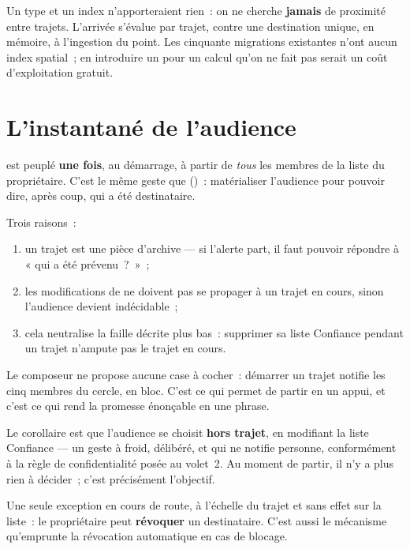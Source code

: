 Un type  et un index  n'apporteraient rien~: on ne cherche
\textbf{jamais} de proximité entre trajets. L'arrivée s'évalue par trajet, contre une
destination unique, en mémoire, à l'ingestion du point. Les cinquante migrations existantes
n'ont aucun index spatial~; en introduire un pour un calcul qu'on ne fait pas serait un coût
d'exploitation gratuit.

\section{L'instantané de l'audience}

 est peuplé \textbf{une fois}, au démarrage, à partir de \emph{tous} les
membres de la liste  du propriétaire. C'est le même geste que
 ()~: matérialiser l'audience
pour pouvoir dire, après coup, qui a été destinataire.

Trois raisons~:

\begin{enumerate}[leftmargin=1.6em]
  \item un trajet est une pièce d'archive --- si l'alerte part, il faut pouvoir répondre à
        « qui a été prévenu~?~»~;
  \item les modifications de  ne doivent pas se propager à un
        trajet en cours, sinon l'audience devient indécidable~;
  \item cela neutralise la faille décrite plus bas~: supprimer sa liste Confiance pendant un
        trajet n'ampute pas le trajet en cours.
\end{enumerate}

\begin{note}
Le composeur ne propose aucune case à cocher~: démarrer un trajet notifie les cinq membres
du cercle, en bloc. C'est ce qui permet de partir en un appui, et c'est ce qui rend la
promesse énonçable en une phrase.

Le corollaire est que l'audience se choisit \textbf{hors trajet}, en modifiant la liste
Confiance --- un geste à froid, délibéré, et qui ne notifie personne, conformément à la
règle de confidentialité posée au volet~2. Au moment de partir, il n'y a plus rien à
décider~; c'est précisément l'objectif.
\end{note}

Une seule exception en cours de route, à l'échelle du trajet et sans effet sur la liste~: le
propriétaire peut \textbf{révoquer} un destinataire. C'est aussi le mécanisme qu'emprunte la
révocation automatique en cas de blocage.

